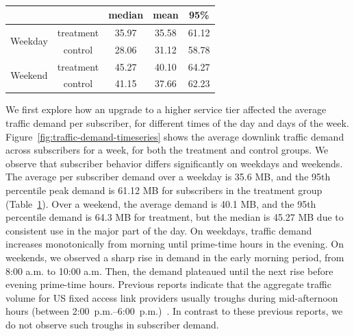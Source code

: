 \begin{table}[t]
\centering
\begin{tabular}{c c | c c c |}
\cline{3-5}
        &           & median & mean  & 95\%  \\ \hline
\multicolumn{1}{|c|}{\multirow{2}{*}{Weekday}} 	& treatment & 35.97  & 35.58 & 61.12 \\
\multicolumn{1}{|c|}{}					        & control   & 28.06  & 31.12 & 58.78 \\\hline
\multicolumn{1}{|c|}{\multirow{2}{*}{Weekend}}	& treatment & 45.27  & 40.10 & 64.27 \\
\multicolumn{1}{|c|}{} 					        & control   & 41.15  & 37.66 & 62.23 \\\hline
\end{tabular}
\caption{}
\label{tab:traffic-demand-description}
\end{table}

We first explore how an upgrade to a higher service tier affected the
average traffic demand per subscriber, for different times of the day
and days of the week.  Figure~\ref{fig:traffic-demand-timeseries} shows
the average downlink traffic demand across subscribers for a week, for
both the treatment and control groups. We observe that subscriber
behavior differs significantly on weekdays and weekends.  The average
per subscriber demand over a weekday is 35.6 MB, and the 95th percentile
peak demand is 61.12 MB for subscribers in the treatment group
(Table~\ref{tab:traffic-demand-description}).  Over a weekend, the
average demand is 40.1 MB, and the 95th percentile demand is 64.3 MB for
treatment, but the median is 45.27 MB due to consistent use in the major
part of the day.  On weekdays, traffic demand increases monotonically
from morning until prime-time hours in the evening. On weekends, we
observed a sharp rise in demand in the early morning period, from 8:00
a.m. to 10:00 a.m. Then, the demand plateaued until the next rise
before evening prime-time hours. Previous reports indicate that
the aggregate traffic volume for US fixed access link providers usually
troughs during mid-afternoon hours (between
2:00~p.m.--6:00~p.m.)~\cite{sandvine20141h}. In contrast to these
  previous reports, we do not observe such troughs in 
subscriber demand.

